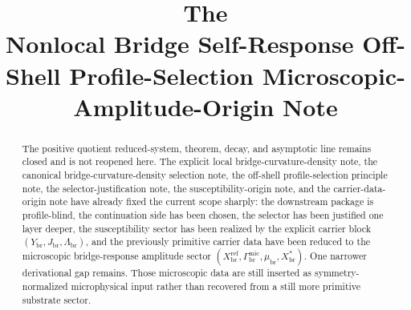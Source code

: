 \documentclass[11pt]{article}
\title{\textbf{The \TheoryName{}}\\[0.4em]
\large Nonlocal Bridge Self-Response Off-Shell Profile-Selection Microscopic-Amplitude-Origin Note}
\author{}
\date{}
\newcommand{\RespCarrier}{Y_{\mathrm{br}}}
\newcommand{\RespFlux}{J_{\mathrm{br}}}
\newcommand{\RespCompat}{\Lambda_{\mathrm{br}}}
\newcommand{\RespMicroEq}{X_{\mathrm{br}}^{\ast}}
\newcommand{\RespMicroRef}{X_{\mathrm{br}}^{\mathrm{ref}}}
\newcommand{\RespMicroFluxCoeff}{\Gamma_{\mathrm{br}}^{\mathrm{mic}}}
\newcommand{\RespMicroGap}{\mu_{\mathrm{br}}}
\begin{document}
\maketitle

\begin{abstract}
The positive quotient reduced-system, theorem, decay, and asymptotic line remains closed and is not reopened here. The explicit local bridge-curvature-density note, the canonical bridge-curvature-density selection note, the off-shell profile-selection principle note, the selector-justification note, the susceptibility-origin note, and the carrier-data-origin note have already fixed the current scope sharply: the downstream package is profile-blind, the continuation side has been chosen, the selector has been justified one layer deeper, the susceptibility sector has been realized by the explicit carrier block \((\RespCarrier,\RespFlux,\RespCompat)\), and the previously primitive carrier data have been reduced to the microscopic bridge-response amplitude sector \((\RespMicroRef,\RespMicroFluxCoeff,\RespMicroGap,\RespMicroEq)\). One narrower derivational gap remains. Those microscopic data are still inserted as symmetry-normalized microphysical input rather than recovered from a still more primitive substrate sector.


\end{abstract}
\end{document}
